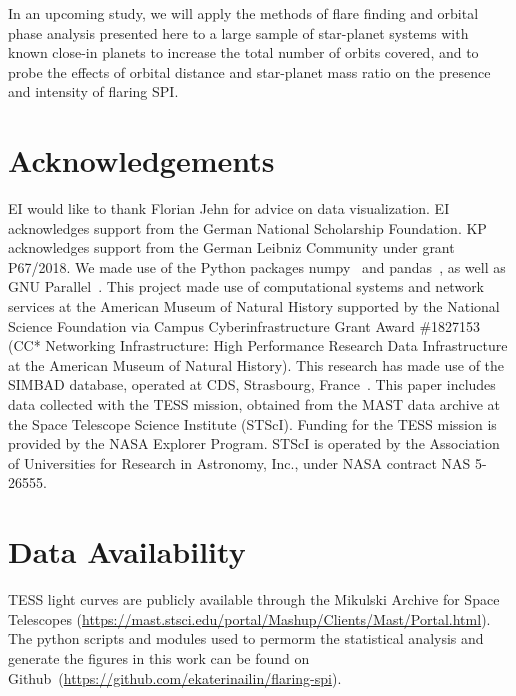 \documentclass[fleqn,usenatbib]{mnras}%
\begin{document}
In an upcoming study, we will apply the methods of flare finding and orbital phase analysis presented here to a large sample of star-planet systems with known close-in planets to increase the total number of orbits covered, and to probe the effects of orbital distance and star-planet mass ratio on the presence and intensity of flaring SPI.
\section*{Acknowledgements}
EI would like to thank Florian Jehn for advice on data visualization. EI acknowledges support from the German National Scholarship Foundation. KP acknowledges support from the German Leibniz Community under grant P67/2018. We made use of the Python packages numpy~\citep{numpy2020} and pandas~\citep{pandas2010,pandas2020software}, as well as GNU Parallel~\citep{tange2018gnu}. This project made use of computational systems and network services at the American Museum of Natural History supported by the National Science Foundation via Campus Cyberinfrastructure Grant Award \#1827153 (CC* Networking Infrastructure: High Performance Research Data Infrastructure at the American Museum of Natural History). This research has made use of the SIMBAD database, operated at CDS, Strasbourg, France~\citep{wenger2000}. This paper includes data collected with the TESS mission, obtained from the MAST data archive at the Space Telescope Science Institute (STScI). Funding for the TESS mission is provided by the NASA Explorer Program. STScI is operated by the Association of Universities for Research in Astronomy, Inc., under NASA contract NAS 5-26555.

\section*{Data Availability}
TESS light curves are publicly available through the Mikulski Archive for Space Telescopes (\url{https://mast.stsci.edu/portal/Mashup/Clients/Mast/Portal.html}). The python scripts and modules used to permorm the statistical analysis and generate the figures in this work can be found on Github~(\url{https://github.com/ekaterinailin/flaring-spi}).
\end{document}

